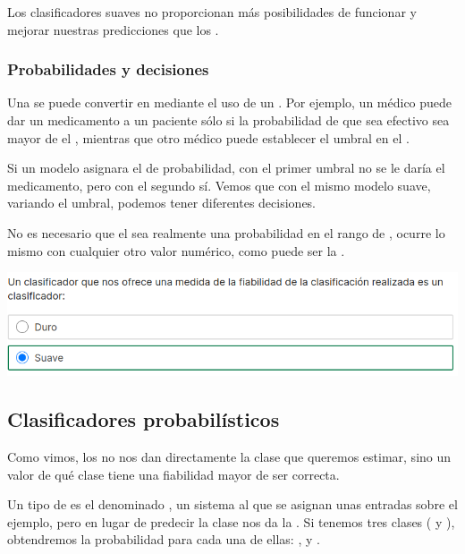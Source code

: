 Los clasificadores suaves no proporcionan más posibilidades de funcionar y mejorar nuestras predicciones que los .

\subsubsection*{Probabilidades y decisiones}

Una  se puede convertir en  mediante el uso de un . Por ejemplo, un médico puede dar un medicamento a un paciente sólo si la probabilidad de que sea efectivo sea mayor de el , mientras que otro médico puede establecer el umbral en el .

Si un modelo asignara el  de probabilidad, con el primer umbral no se le daría el medicamento, pero con el segundo sí. Vemos que con el mismo modelo suave, variando el umbral, podemos tener diferentes decisiones.

No es necesario que el  sea realmente una probabilidad en el rango de , ocurre lo mismo con cualquier otro valor numérico, como puede ser la .

\begin{center}
    \includegraphics[scale=.75]{images/mod02-17.png}
\end{center}

\subsection{Clasificadores probabilísticos}

Como vimos, los  no nos dan directamente la clase que queremos estimar, sino un valor de qué clase tiene una fiabilidad mayor de ser correcta.

Un tipo de  es el denominado , un sistema al que se asignan unas entradas sobre el ejemplo, pero en lugar de predecir la clase nos da la . Si tenemos tres clases ( y ), obtendremos la probabilidad para cada una de ellas: ,   y .

